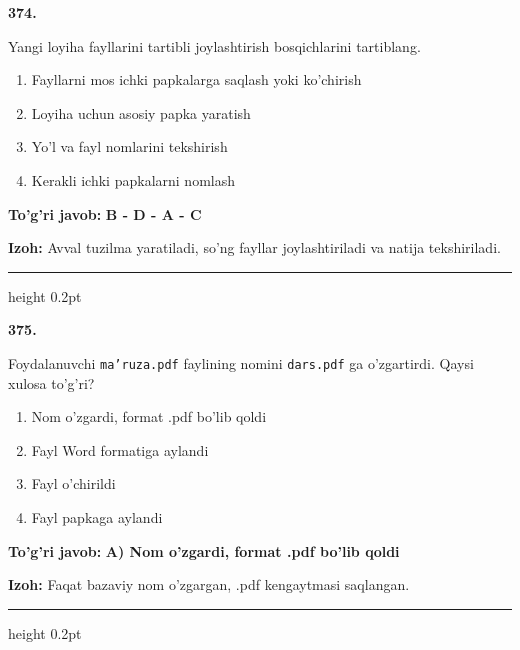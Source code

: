 \documentclass[10pt,a4paper]{article}
\begin{document}
{\bfseries\sffamily\color{ink} 374.}
\par
Yangi loyiha fayllarini tartibli joylashtirish bosqichlarini tartiblang.
\begin{enumerate}[label=\Alph*),leftmargin=9mm]
\item Fayllarni mos ichki papkalarga saqlash yoki ko'chirish
\item Loyiha uchun asosiy papka yaratish
\item Yo'l va fayl nomlarini tekshirish
\item Kerakli ichki papkalarni nomlash
\end{enumerate}
\begin{tcolorbox}[enhanced,breakable,colback=teal!4,colframe=teal!60!black,boxrule=0.45pt,arc=1.2mm,left=2.7mm,right=2.7mm,top=1.8mm,bottom=1.8mm,before skip=2mm,after skip=2mm]
{\bfseries\sffamily\color{teal}To'g'ri javob:} \textbf{B - D - A - C}
\par\smallskip
{\bfseries Izoh:} Avval tuzilma yaratiladi, so'ng fayllar joylashtiriladi va natija tekshiriladi.
\end{tcolorbox}
\vspace{2mm}\hrule height 0.2pt\vspace{3mm}

{\bfseries\sffamily\color{ink} 375.}
\par
Foydalanuvchi \texttt{ma'ruza.pdf} faylining nomini \texttt{dars.pdf} ga o'zgartirdi. Qaysi xulosa to'g'ri?
\begin{enumerate}[label=\Alph*),leftmargin=9mm]
\item Nom o'zgardi, format .pdf bo'lib qoldi
\item Fayl Word formatiga aylandi
\item Fayl o'chirildi
\item Fayl papkaga aylandi
\end{enumerate}
\begin{tcolorbox}[enhanced,breakable,colback=teal!4,colframe=teal!60!black,boxrule=0.45pt,arc=1.2mm,left=2.7mm,right=2.7mm,top=1.8mm,bottom=1.8mm,before skip=2mm,after skip=2mm]
{\bfseries\sffamily\color{teal}To'g'ri javob:} \textbf{A) Nom o'zgardi, format .pdf bo'lib qoldi}
\par\smallskip
{\bfseries Izoh:} Faqat bazaviy nom o'zgargan, .pdf kengaytmasi saqlangan.
\end{tcolorbox}
\vspace{2mm}\hrule height 0.2pt\vspace{3mm}
\end{document}
